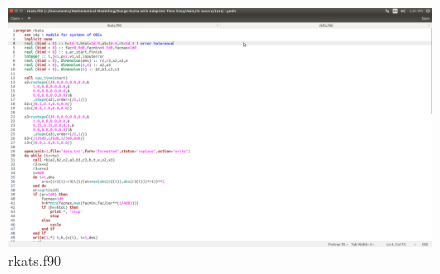 \documentclass[a4paper,oneside]{book}
\numberwithin{equation}{chapter}
\begin{document}
	\begin{figure}[H]
		\centering	\includegraphics[width=15cm]{fig02}
		\caption{rkats.f90}
	\end{figure}
\end{document}
